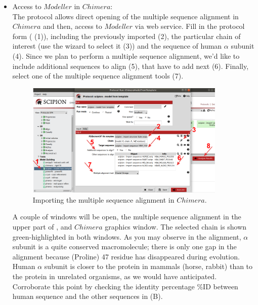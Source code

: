 \begin{itemize}
 \item Access to $Modeller$ in $Chimera$:\\
 The protocol  allows direct opening of the multiple sequence alignment in $Chimera$ and then, access to $Modeller$ via web service. Fill in the protocol form ( (1)), including the   previously imported (2), the particular chain of interest (use the wizard to select it (3)) and the  sequence of human  $\alpha$ subunit (4). Since we plan to perform a multiple sequence alignment, we'd like to include additional sequences to align (5), that have to add next (6). Finally, select one of the multiple sequence alignment tools (7). 
 
 \begin{figure}[H]
  \centering 
  \captionsetup{width=.7\linewidth} 
  \includegraphics[width=0.90\textwidth]{Images/Fig13.png}
  \caption{Importing the multiple sequence alignment in $Chimera$.}
  \label{fig:model_from_template_protocol}
  \end{figure}
 
 A couple of windows will be open, the multiple sequence alignment in the upper part of , and $Chimera$ graphics window. The  selected chain is shown green-highlighted in both windows. As you may observe in the alignment,  $\alpha$ subunit is a quite conserved macromolecule; there is only one gap in the alignment because  (Proline) 47 residue has disappeared during evolution. Human  $\alpha$ subunit is closer to the protein in mammals (horse, rabbit) than to the protein in unrelated organisms, as we would have anticipated. Corroborate this point by checking the identity percentage \%ID  between human sequence and the other sequences in  (B). 
 

\end{itemize}
